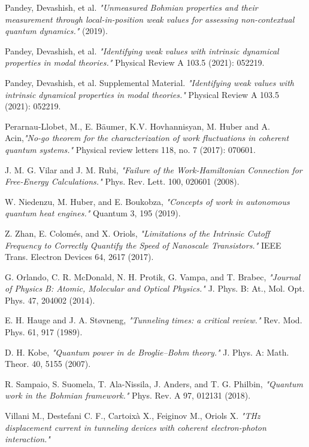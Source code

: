 \documentclass[11pt, a4paper]{article} %
\begin{document}
\begin{thebibliography}{1}
{
Pandey, Devashish, et al. {\em "Unmeasured Bohmian properties and their measurement through local-in-position weak values for assessing non-contextual quantum dynamics."} (2019).

Pandey, Devashish, et al. {\em "Identifying weak values with intrinsic dynamical properties in modal theories."} Physical Review A 103.5 (2021): 052219.

Pandey, Devashish, et al. Supplemental Material. {\em "Identifying weak values with intrinsic dynamical properties in modal theories."} Physical Review A 103.5 (2021): 052219.

Perarnau-Llobet, M., E. Bäumer, K.V. Hovhannisyan, M. Huber and A. Acin,{\em "No-go theorem for the characterization of work fluctuations in coherent quantum systems."} Physical review letters 118, no. 7 (2017): 070601.

J. M. G. Vilar and J. M. Rubi, {\em "Failure of the Work-Hamiltonian Connection for Free-Energy Calculations." }Phys. Rev. Lett. 100, 020601 (2008).

W. Niedenzu, M. Huber, and E. Boukobza, {\em "Concepts of work in autonomous quantum heat engines."} Quantum 3, 195 (2019).

Z. Zhan, E. Colomés, and X. Oriols, {\em  "Limitations of the Intrinsic Cutoff Frequency to Correctly Quantify the Speed of Nanoscale Transistors."} IEEE Trans. Electron Devices 64, 2617 (2017).

G. Orlando, C. R. McDonald, N. H. Protik, G. Vampa, and T. Brabec, {\em "Journal of Physics B: Atomic, Molecular and Optical Physics."} J. Phys. B: At., Mol. Opt. Phys. 47, 204002 (2014).

E. H. Hauge and J. A. Støvneng, {\em "Tunneling times: a critical review."} Rev. Mod. Phys. 61, 917 (1989).

D. H. Kobe, {\em "Quantum power in de Broglie–Bohm theory."} J. Phys. A: Math. Theor. 40, 5155 (2007).

R. Sampaio, S. Suomela, T. Ala-Nissila, J. Anders, and T. G. Philbin, {\em "Quantum work in the Bohmian framework."} Phys. Rev. A 97, 012131 (2018).

Villani M., Destefani C. F., Cartoixà X., Feiginov M., Oriols X. {\em "THz displacement current in tunneling devices with coherent electron-photon
interaction."}

}

\end{thebibliography}
\end{document}
